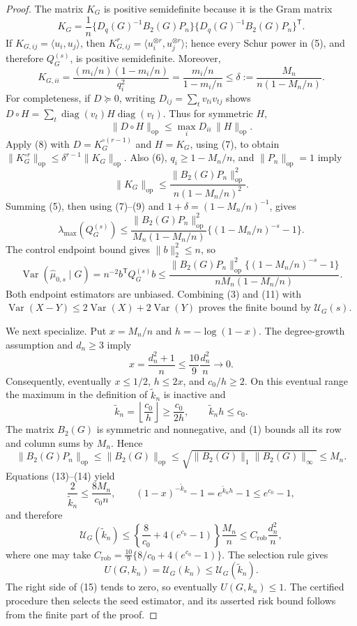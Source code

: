 \documentclass{article}
\begin{document}
\begin{proof}
The matrix \(K_G\) is positive semidefinite because it is the Gram matrix
\[
K_G=\frac1n
\{D_q(G)^{-1}B_2(G)P_n\}
\{D_q(G)^{-1}B_2(G)P_n\}^{\mathsf T}.
\tag{6}
\]
If \(K_{G,ij}=\langle u_i,u_j\rangle\), then
\(K_{G,ij}^r=\langle u_i^{\otimes r},u_j^{\otimes r}\rangle\); hence every Schur power in (5), and therefore \(Q_G^{(s)}\), is positive semidefinite.  Moreover,
\[
K_{G,ii}=\frac{(m_i/n)(1-m_i/n)}{q_i^2}
=\frac{m_i/n}{1-m_i/n}
\le\delta:=\frac{M_n}{n(1-M_n/n)}.
\tag{7}
\]
For completeness, if \(D\succeq0\), writing \(D_{ij}=\sum_t v_{ti}v_{tj}\) shows
\(D\circ H=\sum_t\operatorname{diag}(v_t)H\operatorname{diag}(v_t)\).  Thus for symmetric \(H\),
\[
\|D\circ H\|_{\mathrm{op}}
\le\max_iD_{ii}\,\|H\|_{\mathrm{op}}.
\tag{8}
\]
Apply (8) with \(D=K_G^{\circ(r-1)}\) and \(H=K_G\), using (7), to obtain
\(\|K_G^{\circ r}\|_{\mathrm{op}}\le\delta^{r-1}\|K_G\|_{\mathrm{op}}\).  Also (6), \(q_i\ge1-M_n/n\), and \(\|P_n\|_{\mathrm{op}}=1\) imply
\[
\|K_G\|_{\mathrm{op}}
\le\frac{\|B_2(G)P_n\|_{\mathrm{op}}^2}
{n(1-M_n/n)^2}.
\tag{9}
\]
Summing (5), then using (7)--(9) and \(1+\delta=(1-M_n/n)^{-1}\), gives
\[
\lambda_{\max}(Q_G^{(s)})
\le
\frac{\|B_2(G)P_n\|_{\mathrm{op}}^2}
{M_n(1-M_n/n)}
\{(1-M_n/n)^{-s}-1\}.
\tag{10}
\]
The control endpoint bound gives \(\|b\|_2^2\le n\), so
\[
\operatorname{Var}(\widehat\mu_{0,s}\mid G)
=n^{-2}b^{\mathsf T}Q_G^{(s)}b
\le
\frac{\|B_2(G)P_n\|_{\mathrm{op}}^2
\{(1-M_n/n)^{-s}-1\}}
{nM_n(1-M_n/n)}.
\tag{11}
\]
Both endpoint estimators are unbiased.  Combining (3) and (11) with
\(\operatorname{Var}(X-Y)\le2\operatorname{Var}(X)+2\operatorname{Var}(Y)\) proves the finite bound by \(\mathcal U_G(s)\).

We next specialize.  Put \(x=M_n/n\) and \(h=-\log(1-x)\).  The degree-growth assumption and \(d_n\ge3\) imply
\[
x=\frac{d_n^2+1}{n}\le\frac{10}{9}\frac{d_n^2}{n}\longrightarrow0.
\tag{12}
\]
Consequently, eventually \(x\le1/2\), \(h\le2x\), and \(c_0/h\ge2\).  On this eventual range the maximum in the definition of \(\widetilde k_n\) is inactive and
\[
\widetilde k_n=\left\lfloor\frac{c_0}{h}\right\rfloor
\ge\frac{c_0}{2h},
\qquad
\widetilde k_nh\le c_0.
\tag{13}
\]
The matrix \(B_2(G)\) is symmetric and nonnegative, and (1) bounds all its row and column sums by \(M_n\).  Hence
\[
\|B_2(G)P_n\|_{\mathrm{op}}
\le\|B_2(G)\|_{\mathrm{op}}
\le\sqrt{\|B_2(G)\|_1\|B_2(G)\|_\infty}
\le M_n.
\tag{14}
\]
Equations (13)--(14) yield
\[
\frac{2}{\widetilde k_n}\le\frac{8M_n}{c_0n},
\qquad
(1-x)^{-\widetilde k_n}-1=e^{\widetilde k_nh}-1\le e^{c_0}-1,
\]
and therefore
\[
\mathcal U_G(\widetilde k_n)
\le\left\{\frac8{c_0}+4(e^{c_0}-1)\right\}\frac{M_n}{n}
\le C_{\mathrm{rob}}\frac{d_n^2}{n},
\tag{15}
\]
where one may take
\(C_{\mathrm{rob}}=\frac{10}{9}\{8/c_0+4(e^{c_0}-1)\}\).  The selection rule gives
\[
U(G,k_n)=\mathcal U_G(k_n)\le\mathcal U_G(\widetilde k_n).
\]
The right side of (15) tends to zero, so eventually \(U(G,k_n)\le1\).  The certified procedure then selects the seed estimator, and its asserted risk bound follows from the finite part of the proof.


\end{proof}
\end{document}
